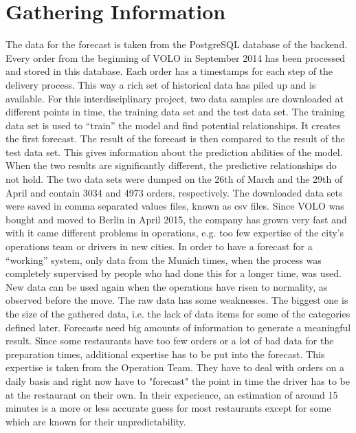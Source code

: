 \section{Gathering Information}\label{section:Gathering Information}
The data for the forecast is taken from the PostgreSQL database of the backend. Every order from the beginning of VOLO in September 2014 has been processed and stored in this database. Each order has a timestamps for each step of the delivery process. This way a rich set of historical data has piled up and is available. For this interdisciplinary project, two data samples are downloaded at different points in time, the training data set and the test data set. The training data set is used to “train” the model and find potential relationships. It creates the first forecast. The result of the forecast is then compared to the result of the test data set. This gives information about the prediction abilities of the model. When the two results are significantly different, the predictive relationships do not hold. The two data sets were dumped on the 26th of March and the 29th of April and contain 3034 and 4973 orders, respectively. The downloaded data sets were saved in comma separated values files, known as csv files. Since VOLO was bought and moved to Berlin in April 2015, the company has grown very fast and with it came different problems in operations, e.g. too few expertise of the city’s operations team or drivers in new cities. In order to have a forecast for a “working” system, only data from the Munich times, when the process was completely supervised by people who had done this for a longer time, was used. New data can be used again when the operations have risen to normality, as observed before the move.\newline
The raw data has some weaknesses. The biggest one is the size of the gathered data, i.e. the lack of data items for some of the categories defined later. Forecasts need big amounts of information to generate a meaningful result. Since some restaurants have too few orders or a lot of bad data for the preparation times, additional expertise has to be put into the forecast. This expertise is taken from the Operation Team. They have to deal with orders on a daily basis and right now have to "forecast" the point in time the driver has to be at the restaurant on their own. In their experience, an estimation of around 15 minutes is a more or less accurate guess for most restaurants except for some which are known for their unpredictability.\newline
